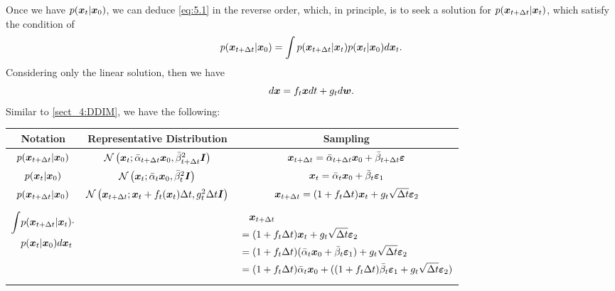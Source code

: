 Once we have $p(\bm{x}_{t}|\bm{x}_0)$, we can deduce \cref{eq:5.1} in the reverse order, which, in principle, is to seek a solution for $p(\bm{x}_{t+\Delta t}|\bm{x}_{t})$, which satisfy the condition of 
\begin{equation}
    \label{eq:5.18}
    p(\bm{x}_{t+\Delta t}|\bm{x}_0) = \int p(\bm{x}_{t+\Delta t}|\bm{x}_{t})p(\bm{x}_{t}|\bm{x}_0)d\bm{x}_{t}.
\end{equation}
Considering only the linear solution, then we have
\begin{equation}
    \label{eq:5.19}
    d\bm{x}=f_t \bm{x} dt+g_t d\bm{w}.
\end{equation}
Similar to \cref{sect_4:DDIM}, we have the following:
\begin{table*}[h]
    \centering
    \begin{tabular}{c|c|c}
    \hline
      Notation    & Representative Distribution &  Sampling\\
    \hline
$p(\bm{x}_{t+\Delta t}|\bm{x}_0)$ & $\mathcal{N}\left(\bm{x}_{t}; \bar{\alpha}_{t+\Delta t}\bm{x}_0,\bar{\beta}^2_{t+\Delta t}\bm{I} \right)$  & $\bm{x}_{t+\Delta t}=\bar{\alpha}_{t+\Delta t}\bm{x}_0 +\bar{\beta}_{t+\Delta t}\bm{\varepsilon}$ \\ \hline
$p(\bm{x}_{t}|\bm{x}_0)$ & $\mathcal{N}\left(\bm{x}_{t}; \bar{\alpha}_{t}\bm{x}_0,\bar{\beta}^2_{t}\bm{I} \right)$  & $\bm{x}_{t}=\bar{\alpha}_{t}\bm{x}_0 +\bar{\beta}_{t}\bm{\varepsilon}_1$ \\ \hline
$p(\bm{x}_{t+\Delta t}|\bm{x}_0)$ &  $\mathcal{N}\left( \bm{x}_{t+\Delta t}; \bm{x}_t+f_t(\bm{x}_t)\Delta t,g_t^2\Delta t\bm{I}\right)$ & $\bm{x}_{t+\Delta t}=(1+f_t \Delta t)\bm{x}_{t}+g_t\sqrt{\Delta t}\bm{\varepsilon}_2$\\\hline
\parbox{3cm}{\begin{align*}
\int &p(\bm{x}_{t+\Delta t}|\bm{x}_{t})\cdot\\
&p(\bm{x}_{t}|\bm{x}_0)d\bm{x}_{t}
\end{align*}} &  &  \parbox{7cm}{\begin{align*}
&\quad \bm{x}_{t+\Delta t}\\
&=(1+f_t \Delta t)\bm{x}_{t}+g_t \sqrt{\Delta t}\bm{\varepsilon}_2\\
&=(1+f_t \Delta t)(\bar{\alpha}_{t}\bm{x}_0 +\bar{\beta}_{t}\bm{\varepsilon}_1) + g_t \sqrt{\Delta t}\bm{\varepsilon}_2\\
&=(1+f_t \Delta t)\bar{\alpha}_{t}\bm{x}_0 + ((1+f_t \Delta t)\bar{\beta}_{t}\bm{\varepsilon}_1+g_t \sqrt{\Delta t}\bm{\varepsilon}_2)
\end{align*}}\\
\hline
    \end{tabular}
\end{table*}

